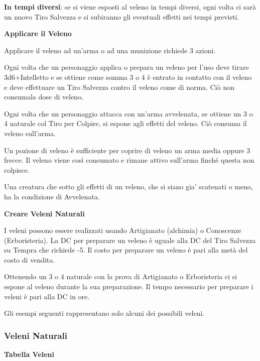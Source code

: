 \documentclass[a4paper,11pt,twoside,openany]{book}
\begin{document}
\textbf{In tempi diversi}: se si viene esposti al veleno in tempi diversi, ogni volta ci sarà un nuovo Tiro Salvezza e si subiranno gli eventuali effetti nei tempi previsti.

\bigskip

\textbf{Applicare il Veleno}

Applicare il veleno ad un'arma o ad una munizione richiede 3 azioni.

Ogni volta che un personaggio applica o prepara un veleno per l'uso deve tirare 3d6+Intelletto e se ottiene come somma 3 o 4 è entrato in contatto con il veleno e deve effettuare un Tiro Salvezza contro il veleno come di norma. Ciò non consumala dose di veleno.

Ogni volta che un personaggio attacca con un'arma avvelenata, se ottiene un 3 o 4 naturale col Tiro per Colpire, si espone agli effetti del veleno. Ciò consuma il veleno sull'arma.

Un pozione di veleno è sufficiente per coprire di veleno un arma media oppure 3 frecce. Il veleno viene così consumato e rimane attivo sull'arma finché questa non colpisce.

Una creatura che sotto gli effetti di un veleno, che si siano gia' scatenati o meno, ha la condizione di Avvelenata.

\medskip

\textbf{Creare Veleni Naturali}

I veleni possono essere realizzati usando Artigianato (alchimia) o Conoscenze (Erboristeria). La DC per preparare un veleno è uguale alla DC del Tiro Salvezza su Tempra che richiede -5. Il costo per preparare un veleno è pari alla metà del costo di vendita.

Ottenendo un 3 o 4 naturale con la prova di Artigianato o Erboristeria ci si espone al veleno durante la sua preparazione. Il tempo necessario per preparare i veleni è pari alla DC in ore.

Gli esempi seguenti rappresentano solo alcuni dei possibili veleni.

\subsubsection{Veleni Naturali}

\textbf{Tabella Veleni}

\medskip
\end{document}
